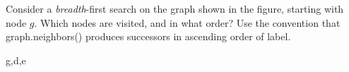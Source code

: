 \begin{prob}
\begin{subprobset}
        \vspace{1em}
        
        \begin{subprob}
	        Consider a \emph{breadth}-first search on the graph shown in
    	    the figure, starting with node $g$.
            Which nodes are visited, and in what order? Use the convention
            that graph.neighbors() produces successors in ascending
            order of label.
        \end{subprob}
        
        \begin{soln}
            g,d,e
        \end{soln}

        \vspace{1em}
            
    \end{subprobset}

\end{prob}
